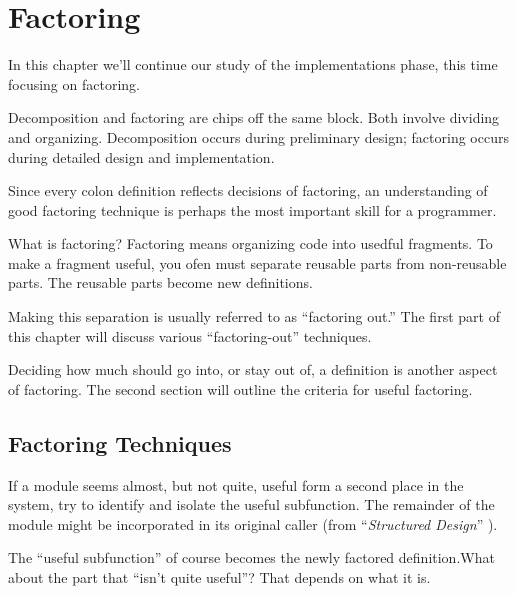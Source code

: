 




\chapter{Factoring}

In this chapter we'll continue our study of the implementations phase, this time focusing on factoring.

Decomposition and factoring are chips off the same block. Both involve dividing and organizing. Decomposition occurs during preliminary design; factoring occurs during detailed design and implementation.

Since every colon definition reflects decisions of factoring, an understanding of good factoring technique is perhaps the most important skill for a \Forth{} programmer.

What is factoring? Factoring means organizing code into usedful fragments. To make a fragment useful, you ofen must separate reusable parts from non-reusable parts. The reusable parts become new definitions.

Making this separation is usually referred to as ``factoring out.'' The first part of this chapter will discuss various ``factoring-out'' techniques.

Deciding how much should go into, or stay out of, a definition is another aspect of factoring. The second section will outline the criteria for useful factoring.

\section{Factoring Techniques}

\begin{tfquot}
If a module seems almost, but not quite, useful form a second place in the system, try to identify and isolate the useful subfunction. The remainder of the module might be incorporated in its original caller (from ``\emph{Structured Design}'' \cite{stevens74-6}).
\end{tfquot}
The ``useful subfunction'' of course becomes the newly factored definition.What about the part that ``isn't quite useful''? That depends on what it is.

